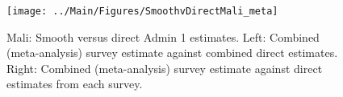 \documentclass[12pt]{article}\usepackage[]{graphicx}\usepackage[]{color}
\newenvironment{knitrout}{}{} %
\begin{document}

\begin{knitrout}
\color{fgcolor}\begin{figure}[bht]

{\centering \texttt{[image: ../Main/Figures/SmoothvDirectMali\_meta]} 

}

\caption[Mali]{Mali: Smooth versus direct Admin 1 estimates. Left: Combined (meta-analysis) survey estimate against combined direct estimates. Right: Combined (meta-analysis) survey estimate against direct estimates from each survey.}\label{fig:unnamed-chunk-213}
\end{figure}


\end{knitrout}
\end{document}
